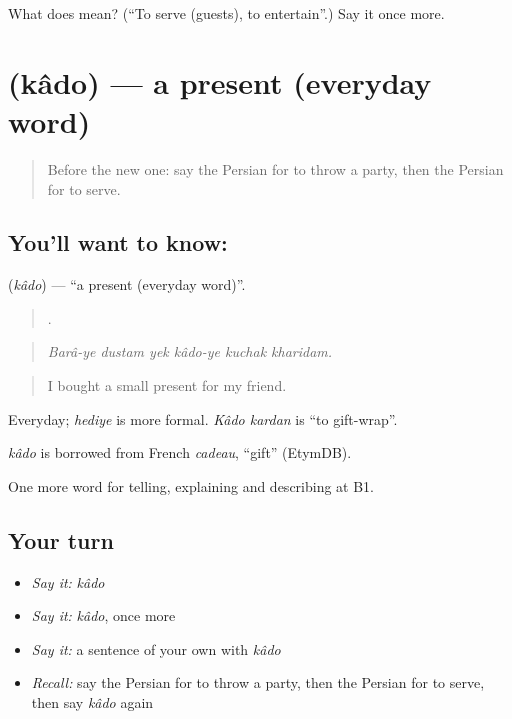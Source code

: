 \begin{tcolorbox}[breakable,colback=teal!4,colframe=teal!35!black,title={Before you move on}]
What does   mean? (\textquotedblleft{}To serve (guests), to entertain\textquotedblright{}.) Say it once more.
\end{tcolorbox}
\section[\texorpdfstring{\fa{کادو} (kâdo)}{کادو (kâdo)}]{ (kâdo) — a present (everyday word)}

\label{lesson:FA-C341-kado}



\begin{quote}
Before the new one: say the Persian for to throw a party, then the Persian for to serve.
\end{quote}

\subsection*{You'll want to know: }
\textbf{} (\emph{kâdo}) — \textquotedblleft{}a present (everyday word)\textquotedblright{}.

\begin{quote}
     .
\end{quote}

\begin{quote}
\emph{Barâ-ye dustam yek kâdo-ye kuchak kharidam.}
\end{quote}

\begin{quote}
I bought a small present for my friend.
\end{quote}

Everyday; \emph{hediye} is more formal. \emph{Kâdo kardan} is \textquotedblleft{}to gift-wrap\textquotedblright{}.

\begin{cousinweb}
\emph{kâdo} is borrowed from French \emph{cadeau}, \textquotedblleft{}gift\textquotedblright{} (EtymDB).
\end{cousinweb}

\begin{grammarlens}[title={What you've built}]
One more word for telling, explaining and describing at B1.
\end{grammarlens}

\subsection*{Your turn}
\begin{itemize}
\raggedright
  \item \emph{Say it:} \emph{kâdo}
  \item \emph{Say it:} \emph{kâdo}, once more
  \item \emph{Say it:} a sentence of your own with \emph{kâdo}
  \item \emph{Recall:} say the Persian for to throw a party, then the Persian for to serve, then say \emph{kâdo} again
\end{itemize}


